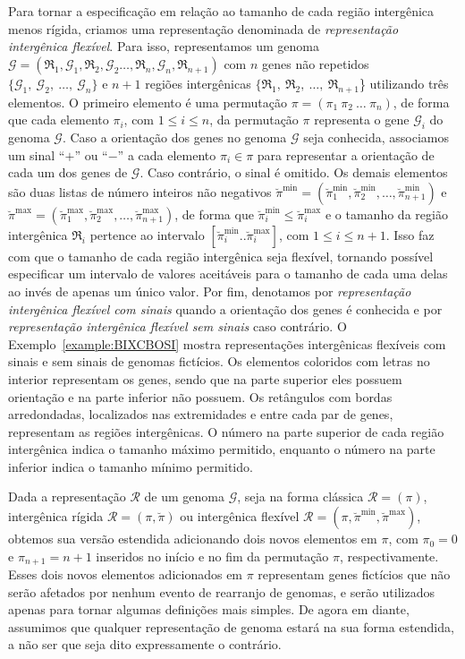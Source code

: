 Para tornar a especificação em relação ao tamanho de cada região intergênica menos rígida, criamos uma representação denominada de \emph{representação intergênica flexível}. Para isso, representamos um genoma $\mathcal{G}=(\mathfrak{R}_1,\mathcal{G}_1,\mathfrak{R}_2,\mathcal{G}_2\dots,\mathfrak{R}_n,\mathcal{G}_n,\mathfrak{R}_{n+1})$ com $n$ genes não repetidos $\{\mathcal{G}_1,\:\mathcal{G}_2,\:\dots,\:\mathcal{G}_n\}$ e $n+1$ regiões intergênicas $\{\mathfrak{R}_1,\:\mathfrak{R}_2,\:\dots,\:\mathfrak{R}_{n+1}$\} utilizando três elementos. O primeiro elemento é uma permutação $\pi=(\pi_1~\pi_2~\dots~\pi_n)$, de forma que cada elemento $\pi_i$, com $1 \le i \le n$, da permutação $\pi$ representa o gene $\mathcal{G}_i$ do genoma $\mathcal{G}$. Caso a orientação dos genes no genoma $\mathcal{G}$ seja conhecida, associamos um sinal ``$+$'' ou ``$-$'' a cada elemento $\pi_i \in \pi$ para representar a orientação de cada um dos genes de $\mathcal{G}$. Caso contrário, o sinal é omitido. Os demais elementos são duas listas de número inteiros não negativos $\breve\pi^{\min}=(\breve\pi^{\min}_1,\breve\pi^{\min}_2,\dots,\breve\pi^{\min}_{n+1})$ e $\breve\pi^{\max}=(\breve\pi^{\max}_1,\breve\pi^{\max}_2,\dots,\breve\pi^{\max}_{n+1})$, de forma que $\breve\pi^{\min}_i \le \breve\pi^{\max}_i$ e o tamanho da região intergênica $\mathfrak{R}_i$ pertence ao intervalo $[\breve\pi^{\min}_{i} .. \breve\pi^{\max}_{i}]$, com $1 \le i \le {n+1}$. Isso faz com que o tamanho de cada região intergênica seja flexível, tornando possível especificar um intervalo de valores aceitáveis para o tamanho de cada uma delas ao invés de apenas um único valor. Por fim, denotamos por \emph{representação intergênica flexível com sinais} quando a orientação dos genes é conhecida e por \emph{representação intergênica flexível sem sinais} caso contrário. O Exemplo~\ref{example:BIXCBOSI} mostra representações intergênicas flexíveis com sinais e sem sinais de genomas fictícios. Os elementos coloridos com letras no interior representam os genes, sendo que na parte superior eles possuem orientação e na parte inferior não possuem. Os retângulos com bordas arredondadas, localizados nas extremidades e entre cada par de genes, representam as regiões intergênicas. O número na parte superior de cada região intergênica indica o tamanho máximo permitido, enquanto o número na parte inferior indica o tamanho mínimo permitido.



Dada a representação $\mathcal{R}$ de um genoma $\mathcal{G}$, seja na forma clássica $\mathcal{R}=(\pi)$, intergênica rígida $\mathcal{R}=(\pi,\breve\pi)$ ou intergênica flexível $\mathcal{R}=(\pi,\breve\pi^{\min},\breve\pi^{\max})$, obtemos sua versão estendida adicionando dois novos elementos em $\pi$, com $\pi_0 = 0$ e $\pi_{n+1} = {n+1}$ inseridos no início e no fim da permutação $\pi$, respectivamente. Esses dois novos elementos adicionados em $\pi$ representam genes fictícios que não serão afetados por nenhum evento de rearranjo de genomas, e serão utilizados apenas para tornar algumas definições mais simples. De agora em diante, assumimos que qualquer representação de genoma estará na sua forma estendida, a não ser que seja dito expressamente o contrário.


